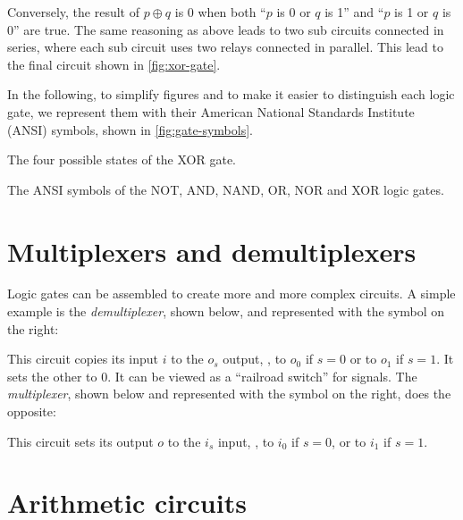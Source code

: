 Conversely, the result of $p \oplus q$ is 0 when both ``$p$ is 0 or $q$ is 1''
and ``$p$ is 1 or $q$ is 0'' are true. The same reasoning as above leads to two
sub circuits connected in series, where each sub circuit uses two relays
connected in parallel. This lead to the final circuit shown in
\cref{fig:xor-gate}.

In the following, to simplify figures and to make it easier to distinguish each
logic gate, we represent them with their American National Standards Institute
(ANSI) symbols, shown in \cref{fig:gate-symbols}.

\begin{Figure}
  

  \caption{The four possible states of the XOR gate.}\label{fig:xor-gate}
\end{Figure}

\begin{Figure}
  

  \caption{The ANSI symbols of the NOT, AND, NAND, OR, NOR and XOR logic
  gates.}\label{fig:gate-symbols}
\end{Figure}

\section{Multiplexers and demultiplexers}

Logic gates can be assembled to create more and more complex circuits. A simple
example is the {\em demultiplexer}, shown below, and represented with the
symbol on the right:

\begin{center}
  
\end{center}

This circuit copies its input $i$ to the $o_s$ output, \ie, to $o_0$ if $s=0$
or to $o_1$ if $s=1$. It sets the other to 0. It can be viewed as a ``railroad
switch'' for signals. The {\em multiplexer}, shown below and represented with
the symbol on the right, does the opposite:

\begin{center}
  
\end{center}

This circuit sets its output $o$ to the $i_s$ input, \ie, to $i_0$ if $s=0$, or
to $i_1$ if $s=1$.

\section{Arithmetic circuits}

